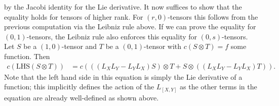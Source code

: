 \documentclass{../mathnotes}
\begin{document}
by the Jacobi identity for the Lie derivative. It now suffices to show that the equality
holds for tensors of higher rank. For $(r,0)$-tensors this follows from the previous
computation via the Leibniz rule above. If we can prove the equality for $(0,1)$-tensors,
the Leibniz rule also enforces this equality for $(0,s)$-tensors. Let $S$ be a $(1,0)$-tensor
and $T$ be a $(0,1)$-tensor with $c(S\otimes T)=f$ some function. Then
\begin{align*}
    c(\text{LHS}(S\otimes T)) &= c\left( ((L_XL_Y-L_YL_X)S)\otimes T+S\otimes ((L_XL_Y-L_YL_X)T)\right).
\end{align*}
Note that the left hand side in this equation is simply the Lie derivative of a function;
this implicitly defines the action of the $L_{[X,Y]}$ as the other terms in the equation
are already well-defined as shown above.
\end{document}
